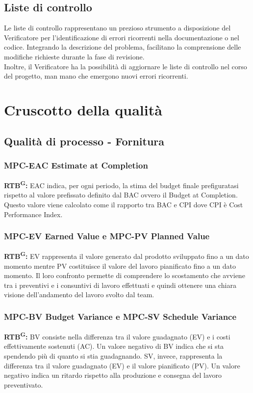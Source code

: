 \documentclass[8pt]{article}
\newcommand{\glossterm}[1]{#1\textsuperscript{G}} %
\begin{document}
\subsection{Liste di controllo}
Le liste di controllo rappresentano un prezioso strumento a disposizione del
Verificatore per l'identificazione di errori ricorrenti nella documentazione o nel codice. Integrando la descrizione del problema, facilitano la comprensione delle modifiche richieste durante la fase di revisione.
\\
Inoltre, il Verificatore ha la possibilità di aggiornare le liste di controllo nel corso del progetto, man mano che emergono nuovi errori ricorrenti.
\section{Cruscotto della qualità}
\subsection{Qualità di processo - Fornitura}
\subsubsection{MPC-EAC Estimate at Completion}
\textbf{\glossterm{RTB}:} EAC indica, per ogni periodo, la stima del budget finale prefiguratasi rispetto al valore prefissato definito dal BAC ovvero il Budget at Completion. Questo valore viene calcolato come il rapporto tra BAC e CPI dove CPI è Cost Performance Index.
\subsubsection{MPC-EV Earned Value e MPC-PV Planned Value}
\textbf{\glossterm{RTB}:} EV rappresenta il valore generato dal prodotto sviluppato fino a un dato momento mentre PV costituisce il valore del lavoro pianificato fino a un dato momento. Il loro confronto permette di comprendere lo scostamento che avviene tra i preventivi e i consuntivi di lavoro effettuati e quindi ottenere una chiara visione dell'andamento del lavoro svolto dal team. 
\subsubsection{MPC-BV Budget Variance e MPC-SV Schedule Variance}
\textbf{\glossterm{RTB}:} BV consiste nella differenza tra il valore guadagnato (EV) e i costi effettivamente sostenuti (AC). Un valore negativo di BV indica che si sta spendendo più di quanto si stia guadagnando. SV, invece, rappresenta la differenza tra il valore guadagnato (EV) e il valore pianificato (PV). Un valore negativo indica un ritardo rispetto alla produzione e consegna del lavoro preventivato.
\end{document}
